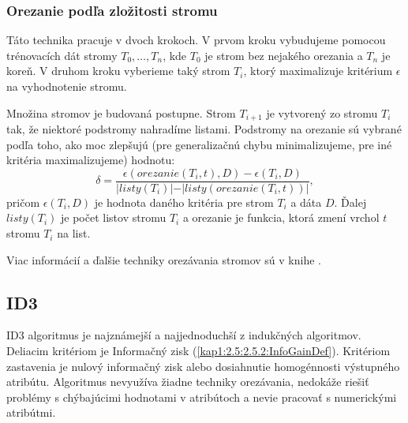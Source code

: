 \subsubsection{Orezanie podľa zložitosti stromu}
Táto technika pracuje v dvoch krokoch. V prvom kroku vybudujeme pomocou trénovacích dát stromy $T_{0},\ldots,T_{n}$, kde $T_{0}$ je strom bez nejakého orezania a $T_{n}$ je koreň. V druhom kroku vyberieme taký strom $T_{i}$, ktorý maximalizuje kritérium $\epsilon$ na vyhodnotenie stromu. 

Množina stromov je budovaná postupne. Strom $T_{i+1}$ je vytvorený zo stromu $T_{i}$ tak, že niektoré podstromy nahradíme listami. Podstromy na orezanie sú vybrané podľa toho, ako moc zlepšujú (pre generalizačnú chybu minimalizujeme, pre iné kritéria maximalizujeme) hodnotu:
\begin{equation}
\delta = \dfrac{\epsilon(orezanie(T_{i},t),D) - \epsilon(T_{i},D)}{\lvert listy(T_{i}) \lvert - \lvert listy(orezanie(T_{i},t)) \lvert}, \nonumber
\end{equation}
pričom $\epsilon(T_{i},D)$ je hodnota daného kritéria pre strom $T_{i}$ a dáta $D$. Ďalej $listy(T_{i})$ je počet listov stromu $T_{i}$ a orezanie je funkcia, ktorá zmení vrchol $t$ stromu $T_{i}$ na list.

Viac informácií a ďalšie techniky orezávania stromov sú v knihe \cite[s. 72]{kap1-DecisionTree}.


\subsection{ID3}\label{kap1:2.7:2.7.3:ID3}
ID3 algoritmus je najznámejší a najjednoduchší z indukčných algoritmov. Deliacim kritériom je Informačný zisk (\ref{kap1:2.5:2.5.2:InfoGainDef}). Kritériom zastavenia je nulový informačný zisk alebo dosiahnutie homogénnosti výstupného atribútu. Algoritmus nevyužíva žiadne techniky orezávania, nedokáže riešiť problémy s chýbajúcimi hodnotami v atribútoch a nevie pracovať s numerickými atribútmi.

